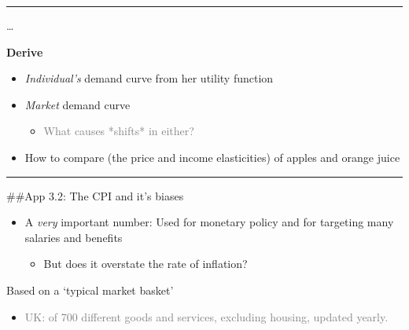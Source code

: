 \documentclass[]{article}
\providecommand{\tightlist}{%
  \setlength{\itemsep}{0pt}\setlength{\parskip}{0pt}}
\begin{document}
\begin{center}\rule{0.5\linewidth}{\linethickness}\end{center}

\ldots{}

\textbf{Derive}

\begin{itemize}
\item
  \emph{Individual's} demand curve from her utility function
\item
  \emph{Market} demand curve

  \begin{itemize}
  \tightlist
  \item
    \textcolor{gray}{What causes *shifts* in either?}
  \end{itemize}
\end{itemize}

\pause

\begin{itemize}
\tightlist
\item
  How to compare (the price and income elasticities) of apples and
  orange juice 
\end{itemize}

\begin{center}\rule{0.5\linewidth}{\linethickness}\end{center}

\#\#App 3.2: The CPI and it's biases


\begin{itemize}
\item
  A \emph{very} important number: Used for monetary policy and for
  targeting many salaries and benefits

  \begin{itemize}
  \tightlist
  \item
    But does it overstate the rate of inflation?
  \end{itemize}
\end{itemize}

\pause

Based on a `typical market basket'

\begin{itemize}
\tightlist
\item
  \textcolor{gray}{UK: of 700 different goods and services, excluding housing, updated yearly.}
\end{itemize}
\end{document}
